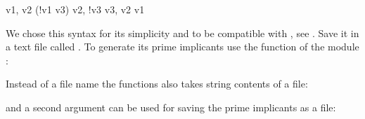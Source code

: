 \documentclass[letterpaper,10pt,english]{sphinxmanual}
\begin{document}
\begin{sphinxVerbatim}[commandchars=\\\{\}]
v1,   v2 \PYGZam{} (!v1 \textbar{} v3)
v2,   !v3
v3,   v2 \textbar{} v1
\end{sphinxVerbatim}

We chose this syntax for its simplicity and to be compatible with , see {\hyperref[\detokenize{Bibliography:mussel2010}]{}}.
Save it in a text file called .
To generate its prime implicants use the function {\hyperref[\detokenize{FileExchange:bnet2primes}]{}} of the module {\hyperref[\detokenize{FileExchange:fileexchange}]{}}:

\begin{sphinxVerbatim}[commandchars=\\\{\}]
   
  
\end{sphinxVerbatim}

Instead of a file name the functions also takes string contents of a  file:

\begin{sphinxVerbatim}[commandchars=\\\{\}]
  
  
\end{sphinxVerbatim}

and a second argument can be used for saving the prime implicants as a  file:

\begin{sphinxVerbatim}[commandchars=\\\{\}]
   
\end{sphinxVerbatim}
\end{document}
